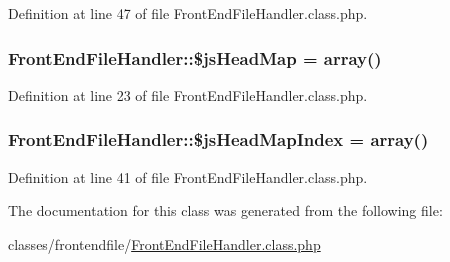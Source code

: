 Definition at line 47 of file Front\+End\+File\+Handler.\+class.\+php.

\hypertarget{classFrontEndFileHandler_ab434f9c8c874aaf8186e259dff95d116}{
\subsubsection[{\$js\+Head\+Map}]{\setlength{\rightskip}{0pt plus 5cm}Front\+End\+File\+Handler\+::\$js\+Head\+Map = array()}}\label{classFrontEndFileHandler_ab434f9c8c874aaf8186e259dff95d116}


Definition at line 23 of file Front\+End\+File\+Handler.\+class.\+php.

\hypertarget{classFrontEndFileHandler_a151a55b31ffaec411a86b7f618eed4ac}{
\subsubsection[{\$js\+Head\+Map\+Index}]{\setlength{\rightskip}{0pt plus 5cm}Front\+End\+File\+Handler\+::\$js\+Head\+Map\+Index = array()}}\label{classFrontEndFileHandler_a151a55b31ffaec411a86b7f618eed4ac}


Definition at line 41 of file Front\+End\+File\+Handler.\+class.\+php.



The documentation for this class was generated from the following file\+:\begin{DoxyCompactItemize}
\item 
classes/frontendfile/\hyperlink{FrontEndFileHandler_8class_8php}{Front\+End\+File\+Handler.\+class.\+php}\end{DoxyCompactItemize}
